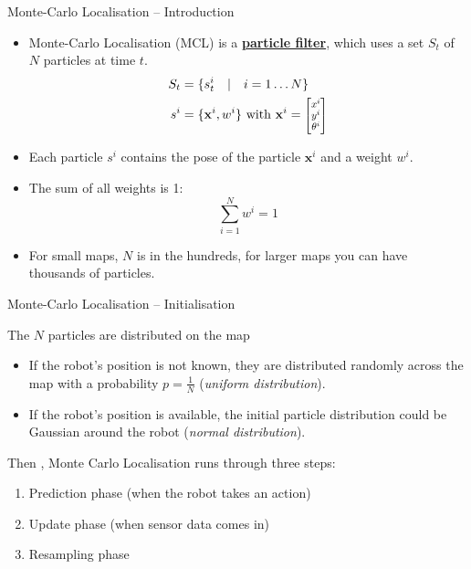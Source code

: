 \documentclass[compress,xcolor=table]{beamer}
\newcommand{\colvec}[2][.8]{%
  \scalebox{#1}{%
    \renewcommand{\arraystretch}{.8}%
    $\begin{bmatrix}#2\end{bmatrix}$%
  }
}
\begin{document}

\begin{frame}{Monte-Carlo Localisation -- Introduction}

    \begin{itemize}
        \item Monte-Carlo Localisation (MCL) is a \textbf{\href{http://en.wikipedia.org/wiki/Particle_filter}{particle
            filter}}, which uses a set $S_t$ of $N$ particles at time
            $t$.
            \large
            \begin{align*}
                S_t &= \{s_t^i \quad|\quad i = 1\ldots N\} \\
                s^i &= \{\mathbf{x}^i, w^i\} \text{ with } \mathbf{x}^i =
                \colvec{x^i \\ y^i \\ \theta^i}
            \end{align*}
            \normalsize
        \item<+-> Each particle $s^i$ contains the pose of the particle $\mathbf{x}^i$ and a weight $w^i$.
        \item<+-> The sum of all weights is 1: \[ \sum_{i=1}^N w^i = 1 \]
        \item<+-> For small maps, $N$ is in the hundreds, for larger maps you
            can have thousands of particles.
    \end{itemize}

\end{frame}

\begin{frame}{Monte-Carlo Localisation -- Initialisation}

    The $N$ particles are distributed on the map

    \begin{itemize}
        \item If the robot's position is not known, they are distributed randomly
            across the map with a probability $p=\frac{1}{N}$ (\emph{uniform
            distribution}).
            \pause
        \item If the robot's position is available, the initial particle
            distribution could be Gaussian around the robot (\emph{normal
            distribution}).
    \end{itemize}

    \pause 

    Then , Monte Carlo Localisation runs through three steps:

    \begin{enumerate}
        \item Prediction phase (when the robot takes an action)
        \item Update phase (when sensor data comes in)
        \item Resampling phase
    \end{enumerate}

\end{frame}
\end{document}
